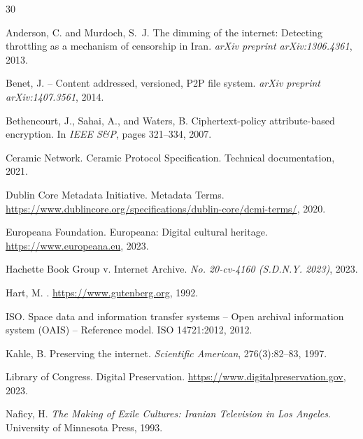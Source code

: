 \documentclass[11pt,a4paper]{article}
\begin{document}


\begin{thebibliography}{30}

Anderson, C. and Murdoch, S.~J.
\newblock The dimming of the internet: Detecting throttling as a mechanism of censorship in {Iran}.
\newblock \emph{arXiv preprint arXiv:1306.4361}, 2013.

Benet, J.
 -- Content addressed, versioned, {P2P} file system.
\newblock \emph{arXiv preprint arXiv:1407.3561}, 2014.

Bethencourt, J., Sahai, A., and Waters, B.
\newblock Ciphertext-policy attribute-based encryption.
\newblock In \emph{IEEE S\&P}, pages 321--334, 2007.

Ceramic Network.
\newblock Ceramic Protocol Specification.
\newblock Technical documentation, 2021.

Dublin Core Metadata Initiative.
 Metadata Terms.
\newblock \url{https://www.dublincore.org/specifications/dublin-core/dcmi-terms/}, 2020.

Europeana Foundation.
\newblock Europeana: Digital cultural heritage.
\newblock \url{https://www.europeana.eu}, 2023.

Hachette Book Group v. Internet Archive.
\newblock \emph{No. 20-cv-4160 (S.D.N.Y. 2023)}, 2023.

Hart, M.
.
\newblock \url{https://www.gutenberg.org}, 1992.

ISO.
\newblock Space data and information transfer systems -- Open archival information system ({OAIS}) -- Reference model.
\newblock ISO 14721:2012, 2012.

Kahle, B.
\newblock Preserving the internet.
\newblock \emph{Scientific American}, 276(3):82--83, 1997.

Library of Congress.
\newblock Digital Preservation.
\newblock \url{https://www.digitalpreservation.gov}, 2023.

Naficy, H.
\newblock \emph{The Making of Exile Cultures: Iranian Television in Los Angeles}.
\newblock University of Minnesota Press, 1993.


\end{thebibliography}
\end{document}
